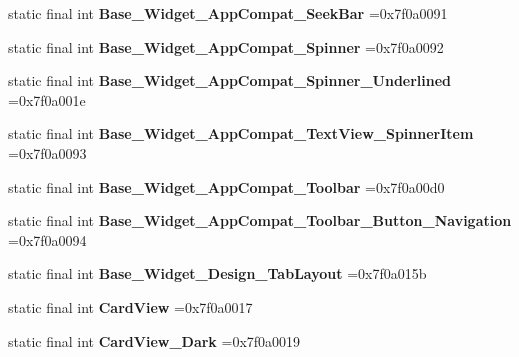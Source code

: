 \begin{DoxyCompactItemize}
static final int {\bfseries Base\+\_\+\+Widget\+\_\+\+App\+Compat\+\_\+\+Seek\+Bar} =0x7f0a0091
\item 
\mbox{\label{classproject4_1_1xaria_1_1R_1_1style_ad3ae9a50698f48f888d0debfd1002cd0}} 
static final int {\bfseries Base\+\_\+\+Widget\+\_\+\+App\+Compat\+\_\+\+Spinner} =0x7f0a0092
\item 
\mbox{\label{classproject4_1_1xaria_1_1R_1_1style_a951467ca30537a7ad51da4e6bcbe427f}} 
static final int {\bfseries Base\+\_\+\+Widget\+\_\+\+App\+Compat\+\_\+\+Spinner\+\_\+\+Underlined} =0x7f0a001e
\item 
\mbox{\label{classproject4_1_1xaria_1_1R_1_1style_afadbec24c17b05aa2f60c07a9f919a6e}} 
static final int {\bfseries Base\+\_\+\+Widget\+\_\+\+App\+Compat\+\_\+\+Text\+View\+\_\+\+Spinner\+Item} =0x7f0a0093
\item 
\mbox{\label{classproject4_1_1xaria_1_1R_1_1style_ae08b97c0f1ce82c11b7967480a903e3d}} 
static final int {\bfseries Base\+\_\+\+Widget\+\_\+\+App\+Compat\+\_\+\+Toolbar} =0x7f0a00d0
\item 
\mbox{\label{classproject4_1_1xaria_1_1R_1_1style_a83989f0885f8f88452bd3d34513a449c}} 
static final int {\bfseries Base\+\_\+\+Widget\+\_\+\+App\+Compat\+\_\+\+Toolbar\+\_\+\+Button\+\_\+\+Navigation} =0x7f0a0094
\item 
\mbox{\label{classproject4_1_1xaria_1_1R_1_1style_aae5a0406bb931d7a45415606d49baed6}} 
static final int {\bfseries Base\+\_\+\+Widget\+\_\+\+Design\+\_\+\+Tab\+Layout} =0x7f0a015b
\item 
\mbox{\label{classproject4_1_1xaria_1_1R_1_1style_ad336039951e7853218620646cb289554}} 
static final int {\bfseries Card\+View} =0x7f0a0017
\item 
\mbox{\label{classproject4_1_1xaria_1_1R_1_1style_a66578560f6aea1bb6cb2127240d2003c}} 
static final int {\bfseries Card\+View\+\_\+\+Dark} =0x7f0a0019
\item 

\end{DoxyCompactItemize}
